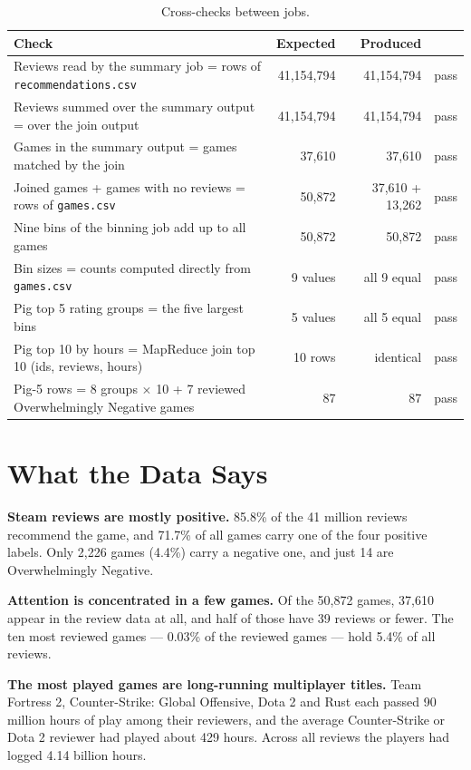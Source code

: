 \documentclass[11pt,a4paper]{article}
\newcommand{\code}[1]{\texttt{#1}}
\begin{document}
\begin{table}[H]\centering\footnotesize
\begin{tabularx}{\linewidth}{X r r c}
\toprule
Check & Expected & Produced & \\
\midrule
Reviews read by the summary job = rows of \code{recommendations.csv} & 41,154,794 & 41,154,794 & pass \\
Reviews summed over the summary output = over the join output & 41,154,794 & 41,154,794 & pass \\
Games in the summary output = games matched by the join & 37,610 & 37,610 & pass \\
Joined games + games with no reviews = rows of \code{games.csv} & 50,872 & 37,610 + 13,262 & pass \\
Nine bins of the binning job add up to all games & 50,872 & 50,872 & pass \\
Bin sizes = counts computed directly from \code{games.csv} & 9 values & all 9 equal & pass \\
Pig top 5 rating groups = the five largest bins & 5 values & all 5 equal & pass \\
Pig top 10 by hours = MapReduce join top 10 (ids, reviews, hours) & 10 rows & identical & pass \\
Pig-5 rows = 8 groups $\times$ 10 + 7 reviewed Overwhelmingly Negative games & 87 & 87 & pass \\
\bottomrule
\end{tabularx}
\caption{Cross-checks between jobs.}
\end{table}

\section{What the Data Says}

\textbf{Steam reviews are mostly positive.} 85.8\% of the 41 million reviews recommend the game, and
71.7\% of all games carry one of the four positive labels. Only 2,226 games (4.4\%) carry a negative one,
and just 14 are Overwhelmingly Negative.

\textbf{Attention is concentrated in a few games.} Of the 50,872 games, 37,610 appear in the review data
at all, and half of those have 39 reviews or fewer. The ten most reviewed games — 0.03\% of the reviewed
games — hold 5.4\% of all reviews.

\textbf{The most played games are long-running multiplayer titles.} Team Fortress 2, Counter-Strike:
Global Offensive, Dota 2 and Rust each passed 90 million hours of play among their reviewers, and the
average Counter-Strike or Dota 2 reviewer had played about 429 hours. Across all reviews the players had
logged 4.14 billion hours.
\end{document}

